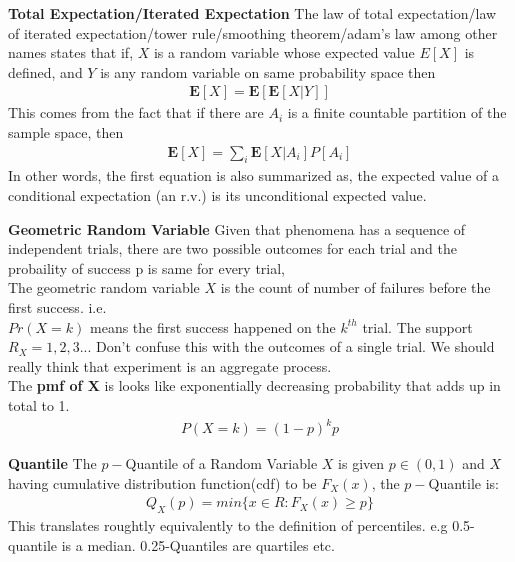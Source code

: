 \documentclass[10pt,a4paper]{article}
\begin{document}
	\begin{defn}{\textbf{Total Expectation/Iterated Expectation}}
		The law of total expectation/law of iterated expectation/tower rule/smoothing theorem/adam's law among other names states that if,
		$X$ is a random variable whose expected value $E[X]$ is defined, and $Y$ is any random variable on same probability space then
		\begin{align}
			\mathbf{E}[X] = \mathbf{E}[\mathbf{E}[X|Y]]
		\end{align}
		This comes from the fact that if there are $A_i$ is a finite countable partition of the sample space,
		then
		\begin{align}
			\mathbf{E}[X] = \sum_{i}\mathbf{E}[X|A_i]P[A_i]
		\end{align}
		In other words, the first equation is also summarized as, the expected value of a conditional expectation (an r.v.) is its unconditional expected value.
	\end{defn}

	\begin{defn}{\textbf{Geometric Random Variable}}
		Given that phenomena has a sequence of independent trials, there are two possible outcomes for each trial and the probaility of success p is same for every trial, \\
		The geometric random variable $X$ is the count of number of failures before the first success.
		i.e. \\ 
		$Pr(X = k)$ means the first success happened on the $k^{th}$ trial.
		The support $R_X={1,2,3..}$.  Don't confuse this with the outcomes of a single trial. We should really think that experiment is an aggregate process.\\
		The \textbf{pmf of X} is looks like exponentially decreasing probability that adds up in total to 1.
		\begin{align}
			P(X = k) = (1-p)^{k}p
		\end{align}
		
	\end{defn}

	\begin{defn}{\textbf{Quantile}}
	The $p-$Quantile of a Random Variable $X$ is given $p \in (0,1)$
	and $X$ having cumulative distribution function(cdf) to be $F_X(x)$, the $p-$Quantile is:
	\begin{align}
	Q_X(p) = min \{ x \in R : F_X(x) \ge p \}
	\end{align}
	This translates roughtly equivalently to the definition of percentiles. e.g 0.5-quantile is a median. 0.25-Quantiles are quartiles etc.
	\end{defn}
\end{document}
